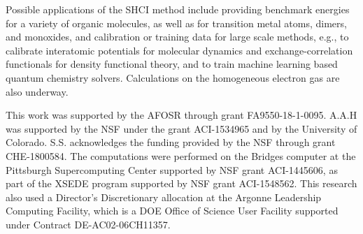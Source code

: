 \documentclass[%
reprint,
 superscriptaddress,
 amsmath,amssymb,
 aps,
]{revtex4-1}
\begin{document}
Possible applications of the SHCI method include providing
benchmark energies for a variety of organic molecules, as well as for transition metal atoms, dimers, and monoxides,
and calibration or training data for large scale methods,
e.g., to calibrate interatomic potentials for molecular dynamics and exchange-correlation functionals for density functional theory,
and to train machine learning based quantum chemistry solvers.
Calculations on the homogeneous electron gas are also underway.\\[1mm]

\begin{acknowledgements}
This work was supported by the AFOSR through grant FA9550-18-1-0095.
A.A.H was supported by the NSF under the grant ACI-1534965 and by the University of Colorado.
S.S. acknowledges the funding provided by the NSF through grant CHE-1800584.
The computations were performed on the Bridges computer at the Pittsburgh Supercomputing Center supported by NSF grant ACI-1445606, as part of the XSEDE program supported by NSF grant ACI-1548562.
This research also used a Director’s Discretionary allocation at the Argonne Leadership Computing Facility, which is
a DOE Office of Science User Facility supported under Contract DE-AC02-06CH11357.
\end{acknowledgements}
\end{document}

